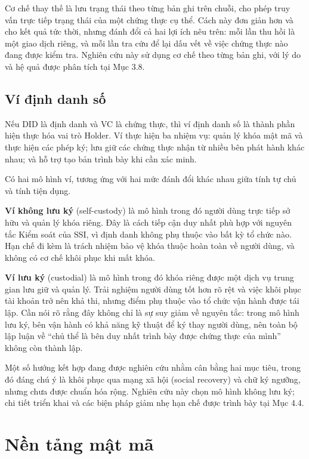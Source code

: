 Cơ chế thay thế là lưu trạng thái theo từng bản ghi trên chuỗi, cho phép truy vấn trực tiếp trạng thái của một chứng thực cụ thể. Cách này đơn giản hơn và cho kết quả tức thời, nhưng đánh đổi cả hai lợi ích nêu trên: mỗi lần thu hồi là một giao dịch riêng, và mỗi lần tra cứu để lại dấu vết về việc chứng thực nào đang được kiểm tra. Nghiên cứu này sử dụng cơ chế theo từng bản ghi, với lý do và hệ quả được phân tích tại Mục 3.8.

\subsection{Ví định danh số}

Nếu DID là định danh và VC là chứng thực, thì ví định danh số là thành phần hiện thực hóa vai trò Holder. Ví thực hiện ba nhiệm vụ: quản lý khóa mật mã và thực hiện các phép ký; lưu giữ các chứng thực nhận từ nhiều bên phát hành khác nhau; và hỗ trợ tạo bản trình bày khi cần xác minh.

Có hai mô hình ví, tương ứng với hai mức đánh đổi khác nhau giữa tính tự chủ và tính tiện dụng.

\textbf{Ví không lưu ký} (self-custody) là mô hình trong đó người dùng trực tiếp sở hữu và quản lý khóa riêng. Đây là cách tiếp cận duy nhất phù hợp với nguyên tắc Kiểm soát của SSI, vì định danh không phụ thuộc vào bất kỳ tổ chức nào. Hạn chế đi kèm là trách nhiệm bảo vệ khóa thuộc hoàn toàn về người dùng, và không có cơ chế khôi phục khi mất khóa.

\textbf{Ví lưu ký} (custodial) là mô hình trong đó khóa riêng được một dịch vụ trung gian lưu giữ và quản lý. Trải nghiệm người dùng tốt hơn rõ rệt và việc khôi phục tài khoản trở nên khả thi, nhưng điểm phụ thuộc vào tổ chức vận hành được tái lập. Cần nói rõ rằng đây không chỉ là sự suy giảm về nguyên tắc: trong mô hình lưu ký, bên vận hành có khả năng kỹ thuật để ký thay người dùng, nên toàn bộ lập luận về {``}chủ thể là bên duy nhất trình bày được chứng thực của mình{''} không còn thành lập.

Một số hướng kết hợp đang được nghiên cứu nhằm cân bằng hai mục tiêu, trong đó đáng chú ý là khôi phục qua mạng xã hội (social recovery) và chữ ký ngưỡng, nhưng chưa được chuẩn hóa rộng. Nghiên cứu này chọn mô hình không lưu ký; chi tiết triển khai và các biện pháp giảm nhẹ hạn chế được trình bày tại Mục 4.4.

\section{Nền tảng mật mã}

